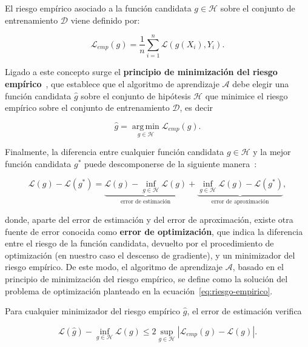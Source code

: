 \begin{definicion}\label{def:riesgo-empírico}
    El riesgo empírico asociado a la función candidata $g \in \mathcal{H}$ sobre el conjunto de entrenamiento $\mathcal{D}$ viene definido por:

    \[ \mathcal{L}_{emp}(g) = \frac{1}{n} \sum_{i=1}^{n}\mathcal{L}(g(X_{i}), Y_{i}). \]
\end{definicion}

Ligado a este concepto surge el \textbf{principio de minimización del riesgo empírico}~\cite{Vapnik1991}, que establece que el algoritmo de aprendizaje $\mathcal{A}$ debe elegir una función candidata $\hat{g}$ sobre el conjunto de hipótesis $\mathcal{H}$ que minimice el riesgo empírico sobre el conjunto de entrenamiento $\mathcal{D}$, es decir

\begin{equation}\label{eq:riesgo-empirico}
    \hat{g} = \operatorname*{\arg \,\min}_{g \in \mathcal{H}} \mathcal{L}_{emp}(g). 
\end{equation}

Finalmente, la diferencia entre cualquier función candidata $g \in \mathcal{H}$ y la mejor función candidata $g^{*}$ puede descomponerse de la siguiente manera~\cite{Lafon2024}:

\[
    \mathcal{L}(g) - \mathcal{L}(g^{*}) = \underbrace{\mathcal{L}(g) - \inf_{g \in \mathcal{H}} \mathcal{L}(g)}_{\text{error de estimación}} + \underbrace{\inf_{g \in \mathcal{H}} \mathcal{L}(g) - \mathcal{L}(g^{*})}_{\text{error de aproximación}},
\]

donde, aparte del error de estimación y del error de aproximación, existe otra fuente de error conocida como \textbf{error de optimización}, que indica la diferencia entre el riesgo de la función candidata, devuelto por el procedimiento de optimización (en nuestro caso el descenso de gradiente), y un minimizador del riesgo empírico. De este modo, el algoritmo de aprendizaje $\mathcal{A}$, basado en el principio de minimización del riesgo empírico, se define como la solución del problema de optimización planteado en la ecuación~\eqref{eq:riesgo-empirico}.

\begin{proposicion}\label{prop:min-riesgo-empirico}
    Para cualquier minimizador del riesgo empírico $\hat{g}$, el error de estimación verifica

    \[ \mathcal{L}(\hat{g}) - \inf_{g \in \mathcal{H}}\mathcal{L}(g) \leq 2 \sup_{g \in \mathcal{H}}|\mathcal{L}_{emp}(g) - \mathcal{L}(g)|. \]
\end{proposicion}

